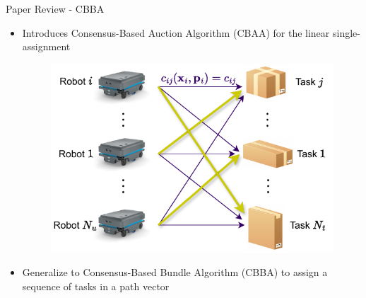 \begin{frame}{Paper Review - CBBA}
    \begin{itemize}
        \item Introduces Consensus-Based Auction Algorithm (CBAA) for the linear single-assignment 
       \begin{figure}
            \centering
            {
            \includegraphics[width=0.4\linewidth]{Figures/CBAA.pdf}}
        \end{figure}
        \pause
        \item Generalize to Consensus-Based Bundle Algorithm (CBBA) to assign a sequence of tasks in a path vector
        
    \end{itemize}
\end{frame}

